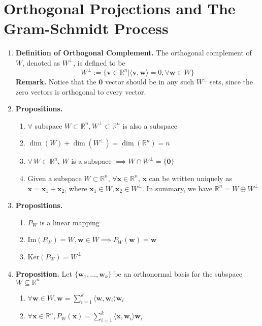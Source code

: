 \documentclass[oneside, 12pt]{book}
\newcommand{\settag}[1]{\renewcommand{\theenumi}{#1}}
\newcommand{\R}{\mathbb{R}}
\newcommand{\tbf}[1]{\textbf{#1}}
\newcommand{\para}[1]{\item \tbf{#1}}
\newcommand{\vv}{\mathbf{v}}
\newcommand{\vw}{\mathbf{w}}
\newcommand{\vx}{\mathbf{x}}
\newcommand{\vzero}{\mathbf{0}}
\begin{document}
\section{Orthogonal Projections and The Gram-Schmidt Process}
\begin{enumerate}
    \settag{4.4.1}
    \para{Definition of Orthogonal Complement.} The orthogonal complement of $W$, denoted as $W^{\perp}$, is defined to be
    \begin{equation*}
        W^\perp := \{\vv\in \R^n | \langle \vv,\vw\rangle = 0, \forall \vw \in W\}
    \end{equation*}
    \textbf{Remark.} Notice that the $\vzero$ vector should be in any such $W^\perp$ sets, since the zero vectors is orthogonal to every vector.
    
    \settag{4.4.3}
    \para{Propositions.}
    \begin{enumerate}
        \item $\forall$ subspace $W \subset \R^n, W^\perp\subset \R^n$ is also a subspace
        \item $\dim(W) + \dim(W^\perp) = \dim(\R^n) = n$
        \item $\forall\, W\subset \R^n$, $W$ is a subspace $\implies W \cap W^\perp = \{\vzero\}$
        \item Given a subspace $W\subset \R^n$, $\forall \vx \in \R^n$, $\vx$ can be written uniquely as $\vx = \vx_1 + \vx_2$, where $\vx_1 \in W, \vx_2 \in W^\perp$. In summary, we have $\R^n = W \oplus W^\perp$
    \end{enumerate}
    
    \settag{4.4.5}
    \para{Propositions.}
    \begin{enumerate}
        \item $P_W$ is a linear mapping
        \item Im$(P_W) = W, \vw \in W \implies P_W(\vw) = \vw$
        \item Ker$(P_W) = W^\perp$
    \end{enumerate}
    
    \settag{4.4.6}
    \para{Proposition.} Let $\{\vw_1,...,\vw_k\}$ be an orthonormal basis for the subspace $W \subseteq \R^n$
    \begin{enumerate}
        \item $\forall \vw \in W, \vw = \sum_{i = 1}^k \langle \vw,\vw_i \rangle \vw_i$
        \item $\forall \vx \in \R^n, P_W(\vx) = \sum_{i = 1}^k \langle \vx,\vw_i \rangle \vw_i$
    \end{enumerate}
    

\end{enumerate}
\end{document}
